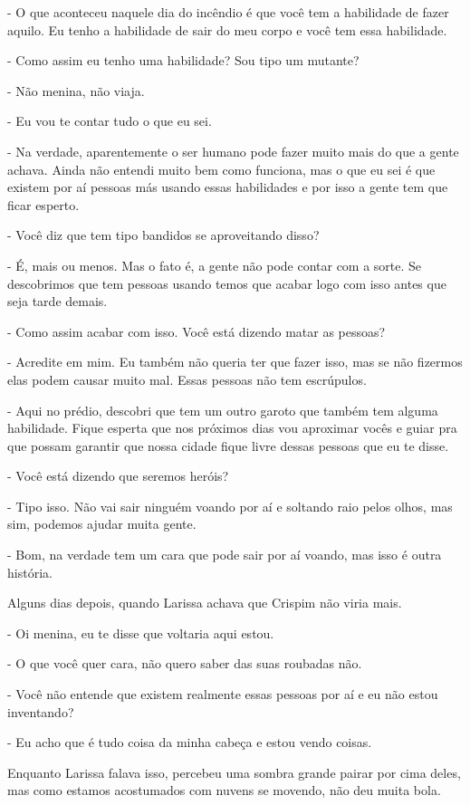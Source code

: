 - O que aconteceu naquele dia do incêndio é que você tem a habilidade de fazer aquilo. Eu tenho a habilidade de sair do meu corpo e você tem essa habilidade.

- Como assim eu tenho uma habilidade? Sou tipo um mutante?

- Não menina, não viaja.

- Eu vou te contar tudo o que eu sei.

- Na verdade, aparentemente o ser humano pode fazer muito mais do que a gente achava. Ainda não entendi muito bem como funciona, mas o que eu sei é que existem por aí pessoas más usando essas habilidades e por isso a gente tem que ficar esperto.

- Você diz que tem tipo bandidos se aproveitando disso?

- É, mais ou menos. Mas o fato é, a gente não pode contar com a sorte. Se descobrimos que tem pessoas usando temos que acabar logo com isso antes que seja tarde demais.

- Como assim acabar com isso. Você está dizendo matar as pessoas?

- Acredite em mim. Eu também não queria ter que fazer isso, mas se não fizermos elas podem causar muito mal. Essas pessoas não tem escrúpulos.

- Aqui no prédio, descobri que tem um outro garoto que também tem alguma habilidade. Fique esperta que nos próximos dias vou aproximar vocês e guiar pra que possam garantir que nossa cidade fique livre dessas pessoas que eu te disse.

- Você está dizendo que seremos heróis?

- Tipo isso. Não vai sair ninguém voando por aí e soltando raio pelos olhos, mas sim, podemos ajudar muita gente.

- Bom, na verdade tem um cara que pode sair por aí voando, mas isso é outra história.

Alguns dias depois, quando Larissa achava que Crispim não viria mais.

- Oi menina, eu te disse que voltaria aqui estou.

- O que você quer cara, não quero saber das suas roubadas não.

- Você não entende que existem realmente essas pessoas por aí e eu não estou inventando?

- Eu acho que é tudo coisa da minha cabeça e estou vendo coisas.

Enquanto Larissa falava isso, percebeu uma sombra grande pairar por cima deles, mas como estamos acostumados com nuvens se movendo, não deu muita bola. 

